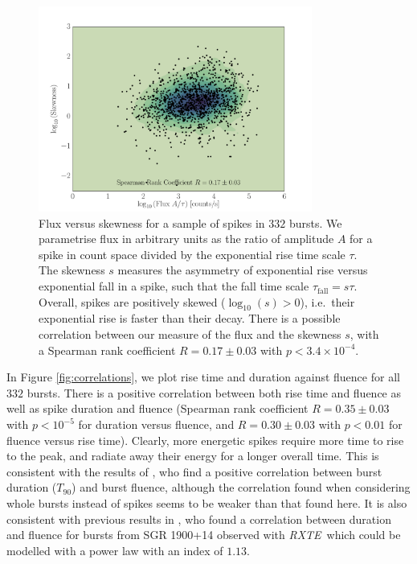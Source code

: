 \documentclass[12pt]{emulateapj}
\newcommand{\project}[1]{\textsl{#1}}
\newcommand{\rxte}{\project{RXTE}}
\begin{document}
\begin{figure}[htbp]
\begin{center}
\includegraphics[width=9cm]{f8.pdf}%
\caption{Flux versus skewness for a sample of spikes in $332$ bursts. We parametrise flux in arbitrary units as the ratio of amplitude $A$ 
for a spike in count space divided by the exponential rise time scale $\tau$. The skewness $s$ measures the asymmetry
of exponential rise versus exponential fall in a spike, such that the fall time scale $\tau_{\mathrm{fall}} = s\tau$. Overall, spikes are positively skewed ($\log_{10}{(s)} > 0$), i.e.\ their
exponential rise is faster than their decay. There is a possible correlation between our measure of the flux and the skewness $s$, with 
a Spearman rank coefficient $R = 0.17 \pm 0.03$ with $p < 3.4 \times 10^{-4}$.}
\label{fig:skewness}
\end{center}
\end{figure}


In Figure \ref{fig:correlations}, we plot rise time and duration against fluence for all $332$ bursts. There is a positive
correlation between both rise time and fluence as well as spike duration and fluence (Spearman rank coefficient $R = 0.35\pm0.03$ with $p < 10^{-5}$ for duration versus fluence,
and $R = 0.30\pm0.03$ with $p < 0.01$ for fluence versus rise time). Clearly, more energetic spikes require more time to rise to the peak,
and radiate away their energy for a longer overall time. This is consistent with the results of \citet{vanderhorst2012}, who find a positive correlation between burst duration ($T_{90}$)
and burst fluence, although the correlation found when considering whole bursts instead of spikes seems to be weaker than that found here. It is also consistent with 
previous results in \citet{gogus1999}, who found a correlation between
duration and fluence for bursts from SGR 1900+14 observed with \rxte\, which could be modelled with a power law with an index of $1.13$. 
\end{document}

